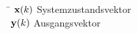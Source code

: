\label{cha:symbolverzeichnis}

\begin{tabbing}
\hspace*{3.0cm} \=  \kill
${\bf x}(k)$ \> Systemzustandsvektor \\
${\bf y}(k)$ \> Ausgangsvektor \\
\end{tabbing}







